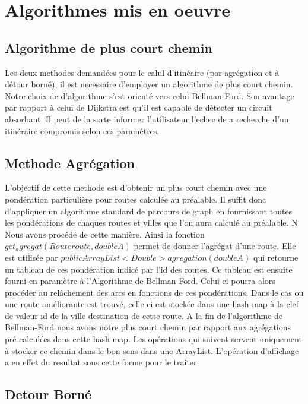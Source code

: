 \chapter{Algorithmes mis en oeuvre}


\section{Algorithme de plus court chemin}
Les deux methodes demandées pour le calul d'itinéaire (par agrégation et à détour borné), il est necessaire  d'employer un algorithme de plus court chemin.
Notre choix de d'algorithme s'est orienté vers celui Bellman-Ford. Son avantage par rapport à celui de Dijkstra est qu'il est capable de détecter un circuit absorbant. Il peut de la sorte informer l'utilisateur l'echec de a recherche d'un itinéraire compromis selon ces paramètres. 



\section{Methode Agrégation}
L'objectif de cette methode est d'obtenir un plus court chemin avec une pondération particulière pour routes calculée au préalable.
Il suffit donc d'appliquer un algorithme standard de parcours de graph en fournissant toutes les pondérations de chaques routes et villes que l'on aura calculé au préalable. N Nous avons procédé de cette manière. Ainsi la fonction $get_agregat(Route route, double A)$ permet de donner l'agrégat d'une route. Elle est utilisée par  $public ArrayList<Double> agregation(double A)$ qui retourne un tableau de ces pondération indicé par l'id des routes. Ce tableau est ensuite fourni en paramètre à l'Algorithme de Bellman Ford. Celui ci pourra alors procéder au relâchement des arcs en fonctions de ces pondérations. Dans le cas ou une route améliorante est trouvé, celle ci est stockée dans une hash map à la clef de valeur id de la ville destination de cette route. A la fin de l'algorithme de Bellman-Ford  nous avons notre plus court chemin par rapport aux agrégations pré calculées dans cette hash map. Les opérations qui suivent servent uniquement à stocker ce chemin dans le bon sens dans une ArrayList. L'opération d'affichage a en effet du resultat sous cette forme pour le traiter.

\section{Detour Borné}
 

